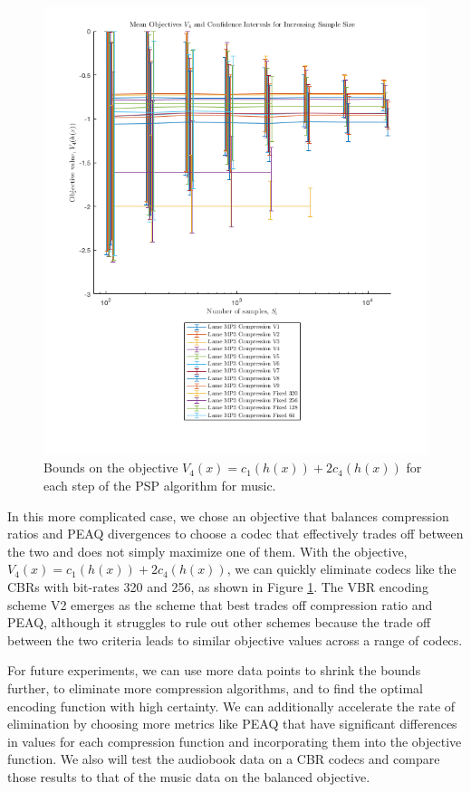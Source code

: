 \documentclass{article}
\begin{document}
{\begin{figure}
    \centering
    \includegraphics[width=\textwidth,trim={1.3cm 1.5cm 1.65cm 0.5cm},clip]{codec_figures/obj4plot.png}
    \caption{Bounds on the objective $V_4(x) = c_1(h(x)) + 2c_4(h(x))$ for each step of the PSP algorithm for music.}
    \label{obj4plot}
\end{figure}

In this more complicated case, we chose an objective that balances compression ratios and PEAQ divergences to choose a codec that effectively trades off between the two and does not simply maximize one of them. With the objective, $V_4(x) =   c_1(h(x))+ 2 c_4(h(x))$, we can quickly eliminate codecs like the CBRs with bit-rates 320 and 256, as shown in Figure \ref{obj4plot}. The VBR encoding scheme V2 emerges as the scheme that best trades off compression ratio and PEAQ, although it struggles to rule out other schemes because the trade off between the two criteria leads to similar objective values across a range of codecs.

For future experiments, we can use more data points to shrink the bounds further, to eliminate more compression algorithms, and to find the optimal encoding function with high certainty. We can additionally accelerate the rate of elimination by choosing more metrics like PEAQ that have significant differences in values for each compression function and incorporating them into the objective function. We also will test the audiobook data on a CBR codecs and compare those results to that of the music data on the balanced objective.

}
\end{document}
